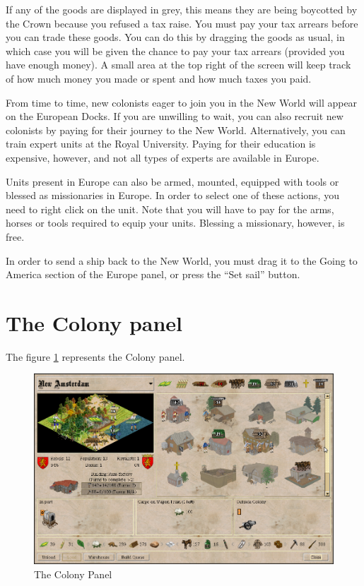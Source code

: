 \documentclass[12pt]{book}
\begin{document}
If any of the goods are displayed in grey, this means they are being
boycotted by the Crown because you refused a tax raise. You must pay
your tax arrears before you can trade these goods. You can do this by
dragging the goods as usual, in which case you will be given the
chance to pay your tax arrears (provided you have enough money). A
small area at the top right of the screen will keep track of how much
money you made or spent and how much taxes you paid.

From time to time, new colonists eager to join you in the New World
will appear on the European Docks. If you are unwilling to wait, you
can also recruit new colonists by paying for their journey to the New
World. Alternatively, you can train expert units at the Royal
University. Paying for their education is expensive, however, and not
all types of experts are available in Europe.

Units present in Europe can also be armed, mounted, equipped with
tools or blessed as missionaries in Europe. In order to select one of
these actions, you need to right click on the unit. Note that you will
have to pay for the arms, horses or tools required to equip your
units. Blessing a missionary, however, is free.

In order to send a ship back to the New World, you must drag it to the
Going to America section of the Europe panel, or press the ``Set
sail'' button.


\hypertarget{colony panel}{\section{The Colony panel}}

The figure \ref{colony_panel_fig} represents the Colony panel.
\begin{figure}[htb]
  \begin{center}
    \includegraphics[scale=0.35]{images/colony_panel.png}
    \caption{The Colony Panel\label{colony_panel_fig}}
  \end{center}
\end{figure}
\end{document}
